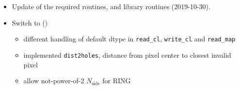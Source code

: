 \documentclass[12pt,twoside]{article}
\newcommand{\nside}{N_{\mathrm{side}}}
\begin{document}
{{\begin{itemize}
  \item Update of the required
    routines, and  library
    routines (2019-10-30).
\end{itemize}
%
%
\begin{itemize}
\item Switch to 
	()
\begin{itemize}
\item different handling of default dtype in \texttt{read\_cl}, \texttt{write\_cl} and \texttt{read\_map}
\item implemented \texttt{dist2holes}, distance from pixel center to closest invalid pixel
\item allow not-power-of-2 $\nside$ for RING
\end{itemize}
\end{itemize}
%



}}
\end{document}
